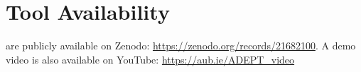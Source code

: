 \section{Tool Availability}
\tool are publicly available on Zenodo:
\url{https://zenodo.org/records/21682100}.
A demo video is also available on YouTube: \url{https://aub.ie/ADEPT_video}

